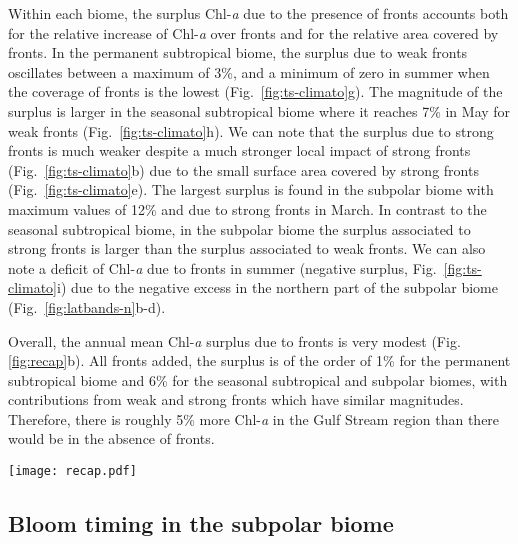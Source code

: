 Within each biome, the surplus Chl\nobreakdash-\emph{a} due to the presence of fronts accounts both for the relative increase of Chl\nobreakdash-\emph{a} over fronts and for the relative area covered by fronts.
In the permanent subtropical biome, the surplus due to weak fronts oscillates between a maximum of 3\%, and a minimum of zero in summer when the coverage of fronts is the lowest (Fig.~\ref{fig:ts-climato}g).
The magnitude of the surplus is larger in the seasonal subtropical biome where it reaches 7\% in May for weak fronts (Fig.~\ref{fig:ts-climato}h).
We can note that the surplus due to strong fronts is much weaker despite a much stronger local impact of strong fronts (Fig.~\ref{fig:ts-climato}b) due to the small surface area covered by strong fronts (Fig.~\ref{fig:ts-climato}e).
The largest surplus is found in the subpolar biome with maximum values of 12\% and due to strong fronts in March.
In contrast to the seasonal subtropical biome, in the subpolar biome the surplus associated to strong fronts is larger than the surplus associated to weak fronts.
We can also note a deficit of Chl\nobreakdash-\emph{a} due to fronts in summer (negative surplus, Fig.~\ref{fig:ts-climato}i) due to the negative excess in the northern part of the subpolar biome (Fig.~\ref{fig:latbands-n}b-d).

Overall, the annual mean Chl\nobreakdash-\emph{a} surplus due to fronts is very modest (Fig.\ref{fig:recap}b).
All fronts added, the surplus is of the order of 1\% for the permanent subtropical biome and 6\% for the seasonal subtropical and subpolar biomes, with contributions from weak and strong fronts which have similar magnitudes.
Therefore, there is roughly 5\% more Chl\nobreakdash-\emph{a} in the Gulf Stream region than there would be in the absence of fronts.

\begin{figure*}
  \texttt{[image: recap.pdf]}
  \caption{
    (a) Annual mean local Chl\nobreakdash-\emph{a}  excess over fronts (in \%), sorted by latitudinal band (x-axis),  by biome (shape of symbol) and by front type (weak fronts in blue, strong fronts in green).
    (b) Annual mean global surplus of Chl\nobreakdash-\emph{a} (in \%) for each biome, sorted by front type.
  }%
  \label{fig:recap}
\end{figure*}


\subsection{Bloom timing in the subpolar biome}

